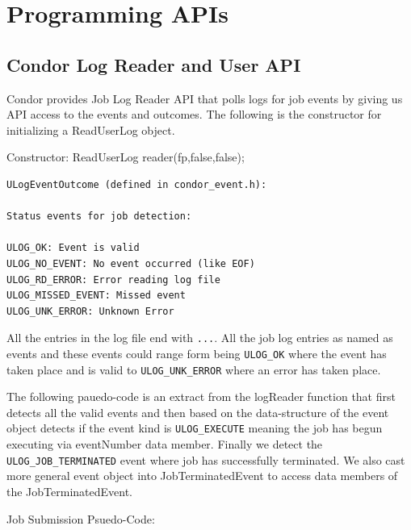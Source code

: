 \documentclass[ms,electronic,double]{nuthesis}
\begin{document}
\section{Programming APIs}
\subsection{Condor Log Reader and User API}

Condor provides Job Log Reader API that polls logs for job events by giving us 
API access to the events and outcomes. The following is the constructor for 
initializing a ReadUserLog object.

Constructor:
ReadUserLog reader(fp,false,false);
\begin{verbatim}
ULogEventOutcome (defined in condor_event.h):

Status events for job detection:

ULOG_OK: Event is valid
ULOG_NO_EVENT: No event occurred (like EOF)
ULOG_RD_ERROR: Error reading log file
ULOG_MISSED_EVENT: Missed event
ULOG_UNK_ERROR: Unknown Error
\end{verbatim}

All the entries in the log file end with \texttt{...}. All the job 
log entries as named as events and these events could range form being  \texttt{ULOG\_OK} where 
the event has taken place and is valid to \texttt{ULOG\_UNK\_ERROR} where an error has 
taken place.

The following pauedo-code is an extract from the logReader function that first 
detects all the valid events and then based on the data-structure of the event 
object detects if the event kind is \texttt{ULOG\_EXECUTE} meaning the job has begun 
executing via eventNumber data member. Finally we detect the \texttt{ULOG\_JOB\_TERMINATED} 
event where job has successfully terminated. We also cast more general event 
object into JobTerminatedEvent to access data members of the JobTerminatedEvent.


Job Submission Psuedo-Code:
\end{document}
